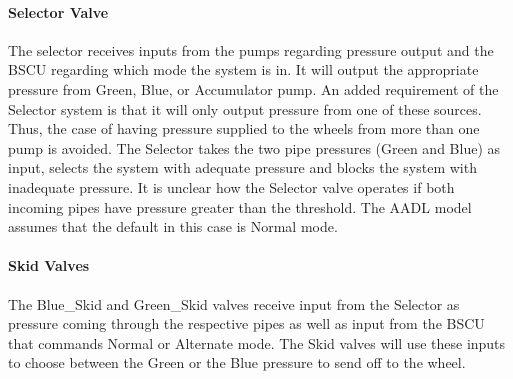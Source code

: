 \paragraph{Selector Valve}
The selector receives inputs from the pumps regarding pressure output and the BSCU regarding which mode the system is in. It will output the appropriate pressure from Green, Blue, or Accumulator pump. An added requirement of the Selector system is that it will only output pressure from one of these sources. Thus, the case of having pressure supplied to the wheels from more than one pump is avoided. The Selector takes the two pipe pressures (Green and Blue) as input, selects the system with adequate pressure and blocks the system with inadequate pressure. It is unclear how the Selector valve operates if both incoming pipes have pressure greater than the threshold. The AADL model assumes that the default in this case is Normal mode.

\paragraph{Skid Valves}
The Blue\_Skid and Green\_Skid valves receive input from the Selector as pressure coming through the respective pipes as well as input from the BSCU that commands Normal or Alternate mode. The Skid valves will use these inputs to choose between the Green or the Blue pressure to send off to the wheel.

